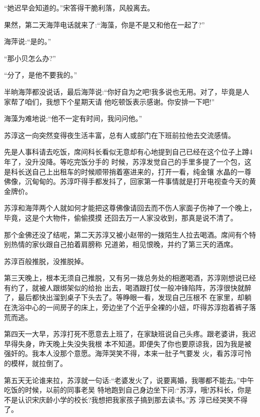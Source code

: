 \documentclass[11pt,a4paper,onecolumn]{article}
\begin{document}
``她迟早会知道的。''宋答得干脆利落，风般离去。

果然，第二天海萍电话就来了:``海藻，你是不是又和他在一起了?''

海萍说:``是的。''

``那小贝怎么办?''

``分了，是他不要我的。''

半晌海萍都没说话，最后海萍说:``你好自为之吧!我多说也无用。对了，毕竟是人家帮了咱们，我想下个星期天请
他吃顿饭表示感谢。你安排一下吧!''

海藻为难地说:``他不一定有时间，我问问他。''

苏淳这一向突然变得夜生活丰富，总有人或部门在下班前拉他去交流感情。

先是人事科请去吃饭，席间科长看似无意却有心地提到自己已经在这个位子上蹲4年了，没升没降。等吃完饭分手的
时候，苏淳发觉自己的手里多提了一个包，这是科长送自己上出租车的时候顺带捎着塞进来的，打开一看，纯金镶
水晶的一尊佛像，沉甸甸的。苏淳吓得手都发抖了，回家第一件事情就是打开电视查今天的黄金牌价。

苏淳和海萍两个人就如何才能把这尊佛像请回去而不伤人家面子伤神了一个晚上，毕竟，这是个大物件，偷偷摸摸
还回去万一人家没收到，那真是说不清了。

那个金佛还没了结呢，第二天苏淳又被小赵带的一拨陌生人拉去喝酒。席间有个特别热情的家伙跟自己拍着肩膀称
兄道弟，相见恨晚，并约了第三天的酒席。

苏淳百般推脱，没推脱掉。

第三天晚上，根本无须自己推脱，又有另一拨总务处的相邀喝酒，苏淳刚想说已经有约了，就被人跟绑架似的给抬
出去，喝酒跟打仗一般冲锋陷阵，苏淳很快就醉了，最后都快出溜到桌子下头去了。等睁眼一看，发现自己压根不
在家里，却躺在洗浴中心的一间房子的床上，旁边坐了个近乎全裸的小妞，吓得苏淳抱着裤子落荒而逃。

第四天一大早，苏淳打死不愿意去上班了，在家缺班说自己头疼。跟老婆讲，我迟早得失身，昨天晚上失没失我根
本不知道。即便失了你也要原谅我，因为我是被强奸的。我本人没那个意愿。海萍哭笑不得，本来一肚子气要发
火，看苏淳可怜的模样，就拉倒了。

第五天无论谁来拉，苏淳就一句话:``老婆发火了，说要离婚，我哪都不能去。''中午吃饭的时候，以前的同事老吴
特地跑到自己身边坐下问:``苏淳，哦!苏科长，你是不是认识宋庆龄小学的校长?我想把我家孩子搞到那去读书。''苏
淳已经哭笑不得了。

\section[\thesection]{}
\end{document}

